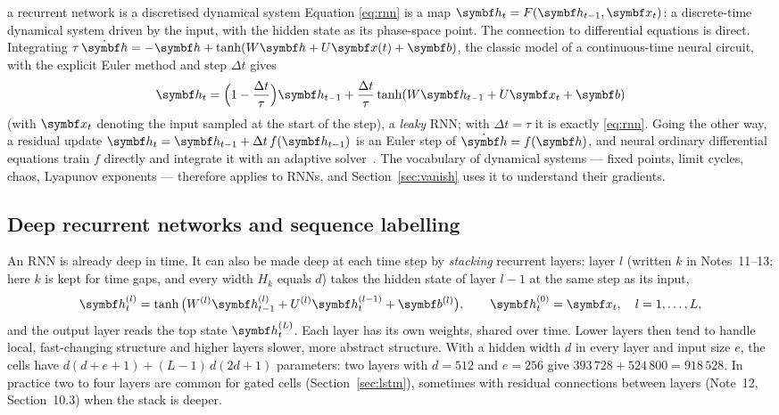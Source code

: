 \documentclass[11pt]{article}
\newcommand{\hv}{\vect{h}}
\newcommand{\bv}{\vect{b}}
\begin{document}
\begin{physics}{a recurrent network is a discretised dynamical system}
Equation \eqref{eq:rnn} is a map $\hv_t = F(\hv_{t-1}, \x_t)$: a discrete-time dynamical system driven by the input,
with the hidden state as its phase-space point. The connection to differential equations is direct. Integrating
$\tau\,\dot{\hv} = -\hv + \tanh(W\hv + U\x(t) + \bv)$, the classic model of a continuous-time neural circuit, with the
explicit Euler method and step $\Delta t$ gives
\[
  \hv_{t} = \Big(1 - \frac{\Delta t}{\tau}\Big)\hv_{t-1} + \frac{\Delta t}{\tau}\tanh(W\hv_{t-1} + U\x_t + \bv)
\]
(with $\x_t$ denoting the input sampled at the start of the step), a \emph{leaky} RNN; with $\Delta t = \tau$ it is exactly \eqref{eq:rnn}. Going the other way, a residual update
$\hv_t = \hv_{t-1} + \Delta t\, f(\hv_{t-1})$ is an Euler step of $\dot{\hv} = f(\hv)$, and neural ordinary differential
equations train $f$ directly and integrate it with an adaptive solver~\cite{chen2018}. The vocabulary of dynamical
systems --- fixed points, limit cycles, chaos, Lyapunov exponents --- therefore applies to RNNs, and
Section~\ref{sec:vanish} uses it to understand their gradients.
\end{physics}

\subsection{Deep recurrent networks and sequence labelling}\label{sec:deep}

An RNN is already deep in time. It can also be made deep at each time step by \emph{stacking} recurrent layers: layer
$l$ (written $k$ in Notes~11--13; here $k$ is kept for time gaps, and every width $H_k$ equals $d$) takes the hidden state of layer $l - 1$ at the same step as its input,
\begin{equation}\label{eq:deep}
  \hv^{(l)}_t = \tanh\big(W^{(l)}\hv^{(l)}_{t-1} + U^{(l)}\hv^{(l-1)}_t + \bv^{(l)}\big), \qquad
  \hv^{(0)}_t = \x_t, \quad l = 1, \dots, L,
\end{equation}
and the output layer reads the top state $\hv^{(L)}_t$. Each layer has its own weights, shared over time. Lower layers
then tend to handle local, fast-changing structure and higher layers slower, more abstract structure. With a hidden
width $d$ in every layer and input size $e$, the cells have $d(d + e + 1) + (L - 1)\,d(2d + 1)$ parameters: two layers with
$d = 512$ and $e = 256$ give $393\,728 + 524\,800 = 918\,528$. In practice two to four layers are common for gated cells
(Section~\ref{sec:lstm}), sometimes with residual connections between layers (Note~12, Section~10.3) when the stack is
deeper.
\end{document}
